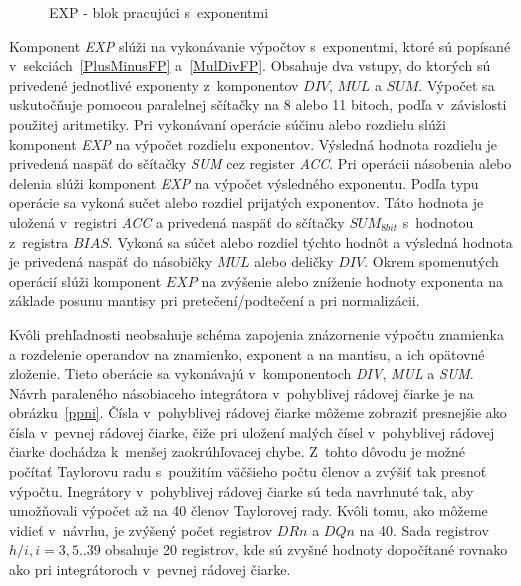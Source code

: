 \bigskip
\begin{figure}[h]
\centering
{}
\caption{EXP - blok pracujúci s~exponentmi}
\label{ppi_fp_exp}
\end{figure}
\bigskip

Komponent \textit{EXP} slúži na vykonávanie výpočtov s~exponentmi, ktoré sú popísané v~sekciách~\ref{PlusMinusFP} a~\ref{MulDivFP}. Obsahuje dva vstupy, do ktorých sú privedené jednotlivé exponenty z~komponentov $ DIV $, $ MUL $ a $ SUM $. Výpočet sa uskutočňuje pomocou paralelnej sčítačky na 8 alebo 11 bitoch, podľa v~závislosti použitej aritmetiky.
Pri vykonávaní operácie súčinu alebo rozdielu slúži komponent \textit{EXP} na výpočet rozdielu exponentov. Výsledná hodnota rozdielu je privedená naspäť do sčítačky \textit{SUM} cez register \textit{ACC}.
Pri operácii násobenia alebo delenia slúži komponent \textit{EXP} na výpočet výsledného exponentu. Podľa typu operácie sa vykoná sučet alebo rozdiel prijatých exponentov. Táto hodnota je uložená v~registri \textit{ACC} a privedená naspäť do sčítačky $ SUM_{8bit} $ s~hodnotou z~registra $ BIAS $. Vykoná sa súčet alebo rozdiel týchto hodnôt a výsledná hodnota je privedená naspäť do násobičky $ MUL $ alebo deličky $ DIV $.
Okrem spomenutých operácií slúži komponent $ EXP $ na zvýšenie alebo zníženie hodnoty exponenta na základe posunu mantisy pri pretečení/podtečení a pri normalizácii.

Kvôli prehľadnosti neobsahuje schéma zapojenia  znázornenie výpočtu znamienka a rozdelenie operandov na znamienko, exponent a na mantisu, a ich opätovné zloženie. Tieto oberácie sa vykonávajú v~komponentoch \textit{DIV}, \textit{MUL} a \textit{SUM}.\\

Návrh paraleného násobiaceho integrátora v~pohyblivej rádovej čiarke je na obrázku~\ref{ppni}. Čísla v~pohyblivej rádovej čiarke môžeme zobraziť presnejšie ako čísla v~pevnej rádovej čiarke, čiže pri uložení malých čísel v~pohyblivej rádovej čiarke dochádza k~menšej zaokrúhľovacej chybe. Z~tohto dôvodu je možné počítať Taylorovu radu s~použitím väčšieho počtu členov a zvýšiť tak presnoť výpočtu. Inegrátory v~pohyblivej rádovej čiarke sú teda navrhnuté tak, aby umožňovali výpočet až na 40 členov Taylorovej rady. Kvôli tomu, ako môžeme vidieť v~návrhu, je zvýšený počet registrov $ DRn $ a $ DQn $ na 40. Sada registrov $ h/i, i=3,5..39 $ obsahuje 20 registrov, kde sú zvyšné hodnoty dopočítané rovnako ako pri integrátoroch v~pevnej rádovej čiarke.

